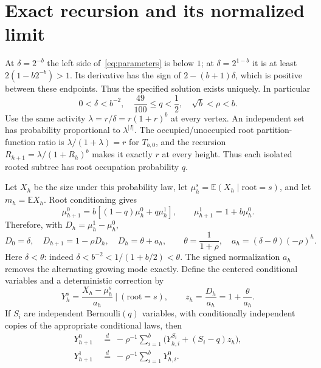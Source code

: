 \documentclass[11pt]{article}
\newcommand{\E}{\mathbb E}
\begin{document}
\section{Exact recursion and its normalized limit}
At $\delta=2^{-b}$ the left side of~\eqref{eq:parameters} is below $1$;
at $\delta=2^{1-b}$ it is at least $2(1-b2^{-b})>1$. Its derivative has
the sign of $2-(b+1)\delta$, which is positive between these endpoints.
Thus the specified solution exists uniquely. In particular
\begin{equation}\label{eq:bounds}
 0<\delta<b^{-2},\quad \frac{49}{100}\le q<\frac12,
 \quad \sqrt b<\rho<b.
\end{equation}
Use the same activity $\lambda=r/\delta=r(1+r)^b$ at every vertex.
An independent set has probability proportional to $\lambda^{|I|}$.
The occupied/unoccupied root partition-function ratio is
$\lambda/(1+\lambda)=r$ for $T_{b,0}$, and the recursion
$R_{h+1}=\lambda/(1+R_h)^b$ makes it exactly $r$ at every height.
Thus each isolated rooted subtree has root occupation probability $q$.

Let $X_h$ be the size under this probability law, let
$\mu_h^s=\E(X_h\mid\text{root}=s)$, and let $m_h=\E X_h$.
Root conditioning gives
\[
 \mu_{h+1}^0=b[(1-q)\mu_h^0+q\mu_h^1],\qquad
 \mu_{h+1}^1=1+b\mu_h^0.
\]
Therefore, with $D_h=\mu_h^1-\mu_h^0$,
\begin{equation}\label{eq:mode}
 D_0=\delta,\quad D_{h+1}=1-\rho D_h,\quad
 D_h=\theta+a_h,\qquad
 \theta=\frac1{1+\rho},\quad a_h=(\delta-\theta)(-\rho)^h.
\end{equation}
Here $\delta<\theta$: indeed $\delta<b^{-2}<1/(1+b/2)<\theta$.
The signed normalization $a_h$ removes the alternating growing mode
exactly. Define the centered conditional variables and a deterministic
correction by
\[
 Y_h^s=\frac{X_h-\mu_h^s}{a_h}\ \Big|\ (\text{root}=s),\qquad
 z_h=\frac{D_h}{a_h}=1+\frac{\theta}{a_h}.
\]
If $S_i$ are independent Bernoulli$(q)$ variables, with conditionally
independent copies of the appropriate conditional laws, then
\begin{equation}\label{eq:smoothing}
 \begin{split}
 Y_{h+1}^0&\ \overset d=\ -\rho^{-1}
   \sum_{i=1}^b\bigl(Y_{h,i}^{S_i}+(S_i-q)z_h\bigr),\\
 Y_{h+1}^1&\ \overset d=\ -\rho^{-1}\sum_{i=1}^bY_{h,i}^0.
 \end{split}
\end{equation}
\end{document}
